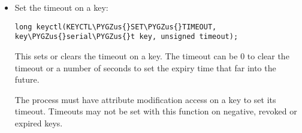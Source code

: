 \documentclass[a4paper,8pt,english]{sphinxmanual}
\def\PYGZus{\char`\_}
\def\PYGZhy{\char`\-}
\begin{document}
\begin{itemize}
This sets the default keyring to which implicitly requested keys will be
attached for this thread. reqkey\_defl should be one of these constants:

\begin{Verbatim}[commandchars=\\\{\}]
CONSTANT                                VALUE   NEW DEFAULT KEYRING
======================================  ======  =======================
KEY\PYGZus{}REQKEY\PYGZus{}DEFL\PYGZus{}NO\PYGZus{}CHANGE               \PYGZhy{}1      No change
KEY\PYGZus{}REQKEY\PYGZus{}DEFL\PYGZus{}DEFAULT                 0       Default[1]
KEY\PYGZus{}REQKEY\PYGZus{}DEFL\PYGZus{}THREAD\PYGZus{}KEYRING          1       Thread keyring
KEY\PYGZus{}REQKEY\PYGZus{}DEFL\PYGZus{}PROCESS\PYGZus{}KEYRING         2       Process keyring
KEY\PYGZus{}REQKEY\PYGZus{}DEFL\PYGZus{}SESSION\PYGZus{}KEYRING         3       Session keyring
KEY\PYGZus{}REQKEY\PYGZus{}DEFL\PYGZus{}USER\PYGZus{}KEYRING            4       User keyring
KEY\PYGZus{}REQKEY\PYGZus{}DEFL\PYGZus{}USER\PYGZus{}SESSION\PYGZus{}KEYRING    5       User session keyring
KEY\PYGZus{}REQKEY\PYGZus{}DEFL\PYGZus{}GROUP\PYGZus{}KEYRING           6       Group keyring
\end{Verbatim}

The old default will be returned if successful and error EINVAL will be
returned if reqkey\_defl is not one of the above values.

The default keyring can be overridden by the keyring indicated to the
request\_key() system call.

Note that this setting is inherited across fork/exec.

{[}1{]} The default is: the thread keyring if there is one, otherwise
the process keyring if there is one, otherwise the session keyring if
there is one, otherwise the user default session keyring.

\item {} 
Set the timeout on a key:

\begin{Verbatim}[commandchars=\\\{\}]
long keyctl(KEYCTL\PYGZus{}SET\PYGZus{}TIMEOUT, key\PYGZus{}serial\PYGZus{}t key, unsigned timeout);
\end{Verbatim}

This sets or clears the timeout on a key. The timeout can be 0 to clear
the timeout or a number of seconds to set the expiry time that far into
the future.

The process must have attribute modification access on a key to set its
timeout. Timeouts may not be set with this function on negative, revoked
or expired keys.


\end{itemize}
\end{document}
